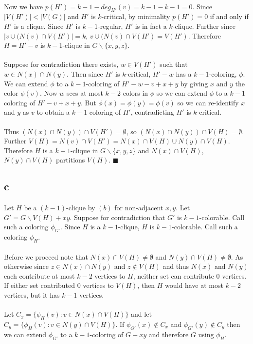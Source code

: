 \documentclass[letterpaper,12pt,oneside,onecolumn]{report}
\begin{document}
\paragraph{}
Now we have $p(H') = k-1 - deg_{H'}(v) = k-1 - k-1 = 0$. Since $|V(H')| < |V(G)|$ and $H'$ is $k$-critical, by minimality $p(H') = 0$ if and only if $H'$ is a clique. Since $H'$ is $k-1$-regular, $H'$ is in fact a $k$-clique. Further since $|v \cup (N(v) \cap V(H')| = k$, $v \cup (N(v) \cap V(H') = V(H')$. Therefore $H = H' - v$ is $k-1$-clique in $G\backslash \{x,y,z\}$.
\paragraph{}
Suppose for contradiction there exists, $w \in V(H')$ such that $w \in N(x) \cap N(y)$. Then since $H'$ is $k$-critical, $H' -w$ has a $k-1$-coloring, $\phi$. We can extend $\phi$ to a $k-1$-coloring of $H' -w - v + x + y$ by giving $x$ and $y$ the color $\phi(v)$. Now $w$ sees at most $k-2$ colors in $\phi$ so we can extend $\phi$ to a $k-1$ coloring of $H' - v + x + y$.  But $\phi(x) = \phi(y) = \phi(v)$  so we can re-identify $x$ and $y$ as $v$ to obtain a $k-1$ coloring of $H'$, contradicting $H'$ is $k$-critical.
\paragraph{}
Thus $(N(x) \cap N(y)) \cap V(H') = \emptyset$, so $(N(x) \cap N(y)) \cap V(H) = \emptyset$. Further $V(H) = N(v) \cap V(H') = N(x) \cap V(H) \cup N(y) \cap V(H)$. Therefore $H$ is a $k-1$-clique in $G\backslash \{x,y,z\}$ and $N(x) \cap V(H)$, $N(y) \cap V(H)$ partitions $V(H)$. $\blacksquare$
\subsection*{c}
\paragraph{}
Let $H$ be a $(k-1)$-clique by $(b)$ for non-adjacent $x,y$. Let $G' = G\backslash V(H) + xy$. Suppose for contradiction that $G'$ is $k-1$-colorable. Call such a coloring $\phi_{G'}$. Since $H$ is a $k-1$-clique, $H$ is $k-1$-colorable. Call such a coloring $\phi_{H}$. 
\paragraph{}
Before we proceed note that $N(x) \cap V(H) \neq \emptyset$ and $N(y) \cap V(H) \neq \emptyset$. As otherwise since $z \in N(x) \cap N(y)$ and $z \not \in V(H)$ and thus $N(x)$ and $N(y)$ each contribute at most $k-2$ vertices to $H$, neither set can contribute $0$ vertices. If either set contributed $0$ vertices to $V(H)$, then $H$ would have at most $k-2$ vertices, but it has $k-1$ vertices.
\paragraph{}
Let $C_x = \{\phi_H(v) : v \in N(x) \cap V(H) \}$ and let $C_y = \{\phi_H(v) : v \in N(y) \cap V(H) \}$. If $\phi_{G'}(x) \not\in C_x$ and $\phi_{G'}(y) \not\in C_y$ then we can extend $\phi_{G'}$ to a $k-1$-coloring of $G + xy$ and therefore $G$ using $\phi_H$.
\end{document}
